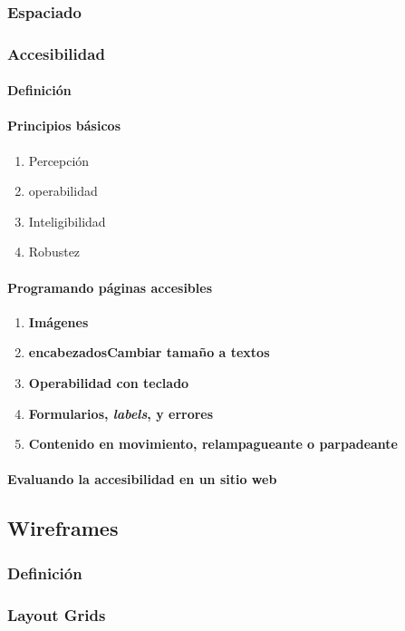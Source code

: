 \documentclass[12pt]{report}
\begin{document}
			\subsubsection{Espaciado}
			\subsubsection{Accesibilidad}
				\paragraph{Definición}
				\paragraph{Principios básicos}
					\begin{enumerate}
						\item Percepción
						\item operabilidad
						\item Inteligibilidad
						\item Robustez
					\end{enumerate}
				\paragraph{Programando páginas accesibles}
					\begin{enumerate}
						\item \textbf{Imágenes}
						\item \textbf{encabezadosCambiar tamaño a textos}
						\item \textbf{Operabilidad con teclado}
						\item \textbf{Formularios, \textit{labels}, y errores}
						\item \textbf{Contenido en movimiento, relampagueante o parpadeante}
					\end{enumerate}
				\paragraph{Evaluando la accesibilidad en un sitio web}
		\subsection{Wireframes}
			\subsubsection{Definición}
			\subsubsection{Layout Grids}
\end{document}
